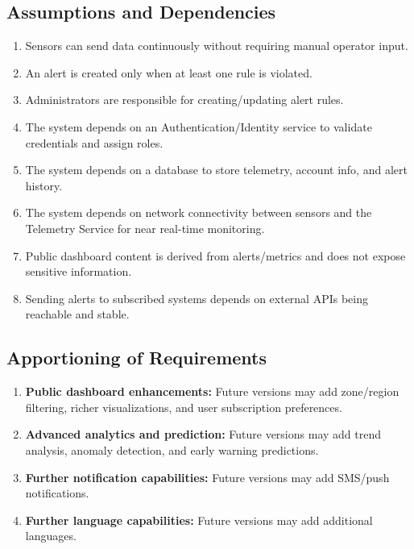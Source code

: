 {\subsection{Assumptions and Dependencies}
\label{sub:assumptions_and_dependencies}
\begin{enumerate}
    \item Sensors can send data continuously without requiring manual operator input.
    \item An alert is created only when at least one rule is violated.
    \item {Administrators} are responsible for creating/updating alert rules.
    \item The system depends on an Authentication/Identity service to validate credentials and assign roles.
    \item The system depends on a database to store telemetry, account info, and alert history.
    \item The system depends on network connectivity between sensors and the Telemetry Service for near real-time monitoring.
    \item Public dashboard content is derived from alerts/metrics and does not expose sensitive information.
    \item Sending alerts to subscribed systems depends on external APIs being reachable and stable.

\end{enumerate}

\subsection{Apportioning of Requirements}
\label{sub:apportioning_of_requirements}
\begin{enumerate}
    \item \textbf{Public dashboard enhancements:} Future versions may add zone/region filtering, richer visualizations, and user subscription preferences.
	\item \textbf{Advanced analytics and prediction:} Future versions may add trend analysis, anomaly detection, and early warning predictions.
    \item \textbf{Further notification capabilities:} Future versions may add SMS/push notifications.
    \item \textbf{Further language capabilities:} Future versions may add additional languages.
\end{enumerate}
}
